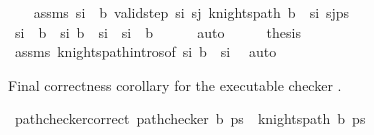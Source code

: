 \begin{isabellebody}
\ \ \isamarkupfalse%
\ assms{\isacharcolon}{\kern0pt}\ {\isachardoublequoteopen}s\isactrlsub i\ {\isasymin}\ b{\isachardoublequoteclose}\ {\isachardoublequoteopen}valid{\isacharunderscore}{\kern0pt}step\ s\isactrlsub i\ s\isactrlsub j{\isachardoublequoteclose}\ {\isachardoublequoteopen}knights{\isacharunderscore}{\kern0pt}path\ {\isacharparenleft}{\kern0pt}b\ {\isacharminus}{\kern0pt}\ {\isacharbraceleft}{\kern0pt}s\isactrlsub i{\isacharbraceright}{\kern0pt}{\isacharparenright}{\kern0pt}\ {\isacharparenleft}{\kern0pt}s\isactrlsub j{\isacharhash}{\kern0pt}ps{\isacharparenright}{\kern0pt}{\isachardoublequoteclose}\isanewline
\ \ \isamarkupfalse%
\ \isamarkupfalse%
\ {\isachardoublequoteopen}s\isactrlsub i\ {\isasymnotin}\ {\isacharparenleft}{\kern0pt}b\ {\isacharminus}{\kern0pt}\ {\isacharbraceleft}{\kern0pt}s\isactrlsub i{\isacharbraceright}{\kern0pt}{\isacharparenright}{\kern0pt}{\isachardoublequoteclose}\ {\isachardoublequoteopen}b\ {\isacharminus}{\kern0pt}\ {\isacharbraceleft}{\kern0pt}s\isactrlsub i{\isacharbraceright}{\kern0pt}\ {\isasymunion}\ {\isacharbraceleft}{\kern0pt}s\isactrlsub i{\isacharbraceright}{\kern0pt}\ {\isacharequal}{\kern0pt}\ b{\isachardoublequoteclose}\isanewline
\ \ \ \ \isamarkupfalse%
\ auto\isanewline
\ \ \isamarkupfalse%
\ \isamarkupfalse%
\ {\isacharquery}{\kern0pt}thesis\isanewline
\ \ \ \ \isamarkupfalse%
\ assms\ knights{\isacharunderscore}{\kern0pt}path{\isachardot}{\kern0pt}intros{\isacharparenleft}{\kern0pt}{}{\isacharparenright}{\kern0pt}{\isacharbrackleft}{\kern0pt}of\ s\isactrlsub i\ {\isachardoublequoteopen}b\ {\isacharminus}{\kern0pt}\ {\isacharbraceleft}{\kern0pt}s\isactrlsub i{\isacharbraceright}{\kern0pt}{\isachardoublequoteclose}{\isacharbrackright}{\kern0pt}\ \isamarkupfalse%
\ auto\isanewline
{}\isamarkupfalse%
%
\endisatagproof
{\isafoldproof}%
%
\isadelimproof
%
\endisadelimproof
%
\begin{isamarkuptext}%
Final correctness corollary for the executable checker .%
\end{isamarkuptext}\isamarkuptrue%
\isamarkupfalse%
\ path{\isacharunderscore}{\kern0pt}checker{\isacharunderscore}{\kern0pt}correct{\isacharcolon}{\kern0pt}\ {\isachardoublequoteopen}path{\isacharunderscore}{\kern0pt}checker\ b\ ps\ {\isasymlongleftrightarrow}\ knights{\isacharunderscore}{\kern0pt}path\ b\ ps{\isachardoublequoteclose}\isanewline
%

\end{isabellebody}
